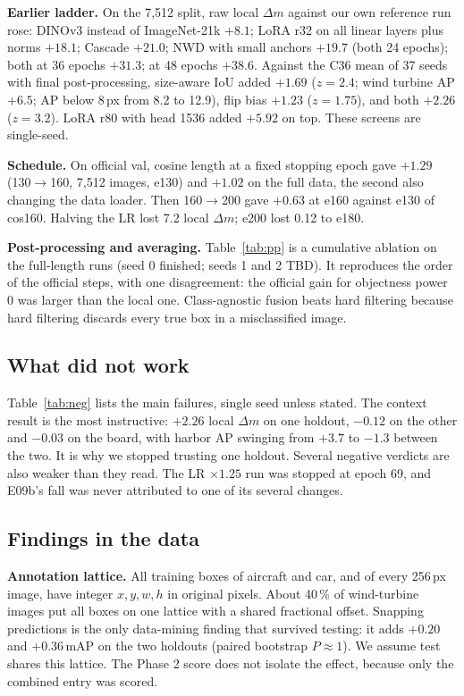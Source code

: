 \documentclass[10pt,twocolumn,letterpaper]{article}
\newcommand{\dm}{\ensuremath{\Delta m}}
\begin{document}


\textbf{Earlier ladder.} On the 7,512 split, raw local \dm{} against our own reference run rose: DINOv3 instead of ImageNet-21k $+8.1$; LoRA r32 on all linear layers plus norms $+18.1$; Cascade $+21.0$; NWD with small anchors $+19.7$ (both 24 epochs); both at 36 epochs $+31.3$; at 48 epochs $+38.6$. Against the C36 mean of 37 seeds with final post-processing, size-aware IoU added $+1.69$ ($z{=}2.4$; wind turbine AP $+6.5$; AP below 8\,px from 8.2 to 12.9), flip bias $+1.23$ ($z{=}1.75$), and both $+2.26$ ($z{=}3.2$). LoRA r80 with head 1536 added $+5.92$ on top. These screens are single-seed.

\textbf{Schedule.} On official val, cosine length at a fixed stopping epoch gave $+1.29$ (130$\to$160, 7,512 images, e130) and $+1.02$ on the full data, the second also changing the data loader. Then 160$\to$200 gave $+0.63$ at e160 against e130 of cos160. Halving the LR lost 7.2 local \dm{}; e200 lost 0.12 to e180.

\textbf{Post-processing and averaging.} Table~\ref{tab:pp} is a cumulative ablation on the full-length runs (seed 0 finished; seeds 1 and 2 TBD). It reproduces the order of the official steps, with one disagreement: the official gain for objectness power 0 was larger than the local one. Class-agnostic fusion beats hard filtering because hard filtering discards every true box in a misclassified image.



\subsection{What did not work}
Table~\ref{tab:neg} lists the main failures, single seed unless stated. The context result is the most instructive: $+2.26$ local \dm{} on one holdout, $-0.12$ on the other and $-0.03$ on the board, with harbor AP swinging from $+3.7$ to $-1.3$ between the two. It is why we stopped trusting one holdout. Several negative verdicts are also weaker than they read. The LR $\times1.25$ run was stopped at epoch 69, and E09b's fall was never attributed to one of its several changes.



\subsection{Findings in the data}
\label{sec:findings}
\textbf{Annotation lattice.} All training boxes of aircraft and car, and of every 256\,px image, have integer $x,y,w,h$ in original pixels. About 40\,\% of wind-turbine images put all boxes on one lattice with a shared fractional offset. Snapping predictions is the only data-mining finding that survived testing: it adds $+0.20$ and $+0.36$\,mAP on the two holdouts (paired bootstrap $P\approx1$). We assume test shares this lattice. The Phase 2 score does not isolate the effect, because only the combined entry was scored.
\end{document}
